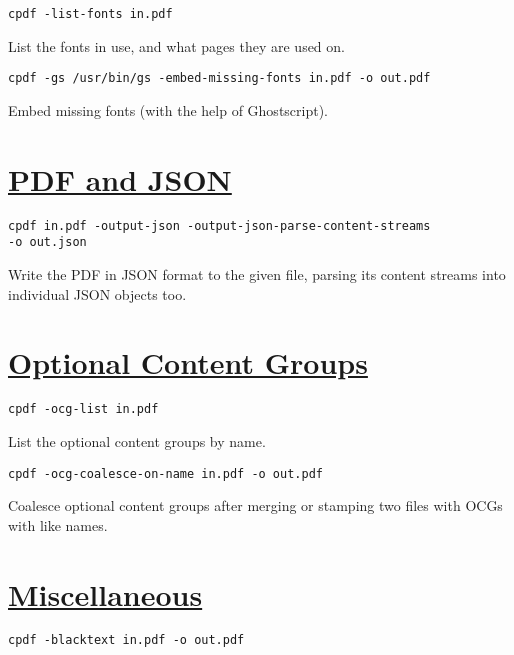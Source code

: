 \documentclass{book}
\begin{document}
\begin{framed}\noindent\texttt{cpdf -list-fonts in.pdf}\end{framed}

\noindent List the fonts in use, and what pages they are used on.

\begin{framed}\noindent\texttt{cpdf -gs /usr/bin/gs -embed-missing-fonts in.pdf -o out.pdf}\end{framed}

\noindent Embed missing fonts (with the help of Ghostscript).

\section*{\hyperref[chap:15]{PDF and JSON}}

\begin{framed}\noindent\texttt{cpdf in.pdf -output-json -output-json-parse-content-streams\\\phantom{\ \ \ \ } -o out.json}\end{framed}

\noindent Write the PDF in JSON format to the given file, parsing its content streams into individual JSON objects too.

\section*{\hyperref[chap:16]{Optional Content Groups}}

\begin{framed}\noindent\texttt{cpdf -ocg-list in.pdf}\end{framed}

\noindent List the optional content groups by name.

\begin{framed}\noindent\texttt{cpdf -ocg-coalesce-on-name in.pdf -o out.pdf}\end{framed}

\noindent Coalesce optional content groups after merging or stamping two files with OCGs with like names.

\section*{\hyperref[chap:misc]{Miscellaneous}}

\begin{framed}\noindent\texttt{cpdf -blacktext in.pdf -o out.pdf}\end{framed}
\end{document}
